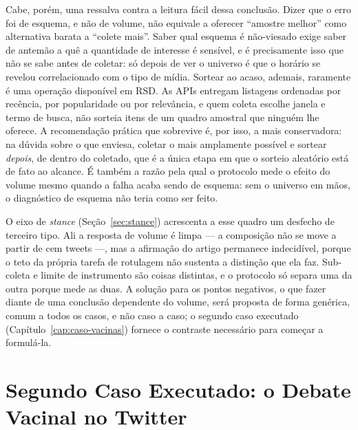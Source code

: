 Cabe, porém, uma ressalva contra a leitura fácil dessa conclusão. Dizer que o erro
foi de esquema, e não de volume, não equivale a oferecer ``amostre melhor'' como
alternativa barata a ``colete mais''. Saber qual esquema é não-viesado exige saber
de antemão a quê a quantidade de interesse é sensível, e é precisamente isso que não
se sabe antes de coletar: só depois de ver o universo é que o horário se revelou
correlacionado com o tipo de mídia. Sortear ao acaso, ademais, raramente é uma
operação disponível em RSD. As APIs entregam listagens ordenadas por recência, por
popularidade ou por relevância, e quem coleta escolhe janela e termo de busca, não
sorteia itens de um quadro amostral que ninguém lhe oferece. A recomendação prática
que sobrevive é, por isso, a mais conservadora: na dúvida sobre o que enviesa,
coletar o mais amplamente possível e sortear \emph{depois}, de dentro do coletado,
que é a única etapa em que o sorteio aleatório está de fato ao alcance. É também a
razão pela qual o protocolo mede o efeito do volume mesmo quando a falha acaba
sendo de esquema: sem o universo em mãos, o diagnóstico de esquema não teria como
ser feito.

O eixo de \emph{stance} (Seção~\ref{sec:stance}) acrescenta a esse quadro um
desfecho de terceiro tipo. Ali a resposta de volume é limpa --- a composição não se
move a partir de cem tweets ---, mas a afirmação do artigo permanece indecidível,
porque o teto da própria tarefa de rotulagem não sustenta a distinção que ela faz.
Sub-coleta e limite de instrumento são coisas distintas, e o protocolo só separa uma
da outra porque mede as duas. A solução para os pontos negativos,
o que fazer diante de uma conclusão dependente do volume, será proposta de forma
genérica, comum a todos os casos, e não caso a caso; o segundo caso executado
(Capítulo~\ref{cap:caso-vacinas}) fornece o contraste necessário para começar a
formulá-la.

\chapter{Segundo Caso Executado: o Debate Vacinal no Twitter}
\label{cap:caso-vacinas}

